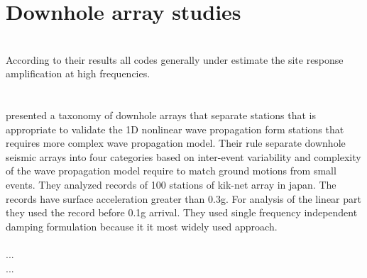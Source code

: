 \section{Downhole array studies}
\noindent
\citet{Kwok2008}\\
According to their results all codes generally under estimate the site response amplification at high frequencies.\\
\\
\citet{Thompson2012} \\
presented a taxonomy of downhole arrays that separate stations that is appropriate to validate the 1D nonlinear wave propagation form stations that requires more complex wave propagation model. Their rule separate downhole seismic arrays into four categories based on inter-event variability and complexity of the wave propagation model require to match ground motions from small events. They analyzed records of 100 stations of kik-net array in japan. The records have surface acceleration greater than 0.3g. For analysis of the linear part they used the record before 0.1g arrival. They used single frequency independent damping formulation because it it most widely used approach. 
\\
\citet{Steidl1996}\\
...
\citet{Kaklamanos2013}\\
...


